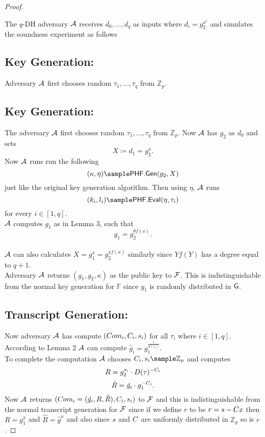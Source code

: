 \begin{proof}
\begin{figure}[htb!]
{\begin{minipage}{1\textwidth}
\begin{nicodemus}
            
            \end{nicodemus}
        \end{minipage}
    }
    \caption{}
    \label{fig:x-soundess}
\end{figure}

The $q$-DH adversary $\mathcal{A}$ receives $d_0,...,d_q$ as inputs where $d_i = g_2^{x^i}$ and simulates the soundness experiment as follows
\subsection*{Key Generation:}
Adversary $\mathcal{A}$ first chooses random $\tau_1,...,\tau_q$ from $\mathbb{Z}_p$. 
\subsection*{Key Generation:} The adversary $\mathcal{A}$ first chooses random $\tau_1,...,\tau_q$ from $\mathbb{Z}_p$. 
Now $\mathcal{A}$ has $g_2$ as $d_0$ and sets 
$$X \coloneqq d_1 = g_2^x.$$
Now $\mathcal{A}$ runs run the following 
$$(\kappa, \eta)\sample \phfGen(g_2,X)$$
just like the original key generation algorithm. Then using $\eta$, $\mathcal{A}$ runs 
$$(k_i,l_i) \sample \phfEval(\eta,\tau_i)$$
for every $i \in [1,q]$.
\\
$\mathcal{A}$ computes $g_1$ as in Lemma 3, such that
$$g_1 = g_2^{\theta f(x)}.$$
\\
$\mathcal{A}$ can also calculates 
$X = g_1^x = g_2^{xf(x)}$ similarly since $Yf(Y)$ has a degree equal to $q+1$.
\\
Adversary $\mathcal{A}$ returns $(g_1,g_2,\kappa)$ as the public key to $\mathcal{F}$. This is indistinguishable from the normal key generation for $\mathbb{F}$ since $g_1$ is randomly distributed in $\mathsf{G}$.

\subsection*{Transcript Generation:}
Now adversary $\mathcal{A}$ has compute $(Com_i,C_i,s_i)$ for all $\tau_i$ where $i \in [1,q]$.
\\
According to Lemma 2 $\mathcal{A}$ can compute $\hat{g}_i = g_1^{\frac{1}{d(\tau_i)}}$.
\\
To complete the computation $\mathcal{A}$ chooses  $\c_i,\s_i\sample\mathbb{Z}_p$ and computes
$$R = g_2^{s_i} \cdot D(\tau)^{-C_i}$$
$$ \hat{R} = \hat{g_i}\cdot g_1^{-C_i}.$$
Now $\mathcal{A}$ returns $(Com_i = (\hat{g_i},R,\hat{R}),C_i,s_i)$ to $\mathcal{F}$ and this is indistinguishable from the normal transcript generation for $\mathcal{F}$ since if we define $r$ to be $r = s-C x$ then $R = g_1^x$ and 
$\hat{R} = \hat{g}^x$ and also since $s$ and $C$ are uniformly distributed in $\mathbb{Z}_p$ so is $r$.
\end{proof}

